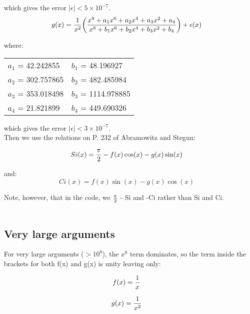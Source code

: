 \noindent which gives the error $|\epsilon| < 5 \times 10^{-7}$.\\

\begin{equation}
g(x) = {1 \over x^2}
\bigg({x^8 + a_1 x^6 + a_2 x^4 + a_3 x^2 + a_4 \over x^8 + b_1 x^6 + b_2 x^4 + b_3 x^2 + b_4}\bigg)
+ \epsilon(x)
\end{equation}

\noindent where:\\

\begin{center}
\begin{tabular}{|ll|}
\hline
$a_1$ = 42.242855 & $b_1$ = 48.196927\\
$a_2$ = 302.757865 & $b_2$ = 482.485984\\
$a_3$ = 353.018498 & $b_3$ = 1114.978885\\
$a_4$ = 21.821899 & $b_4$ = 449.690326\\
\hline
\end{tabular}
\end{center}

\noindent which gives the error $|\epsilon| < 3 \times 10^{-7}$.\\

Then we use the relations on P. 232 of Abramowitz and Stegun:

\begin{equation}
Si(x) = {\pi \over 2} - f(x) \cos(x) - g(x) \sin(x)
\end{equation}

\noindent and:\\

\begin{equation}
Ci(x) = f(x) \sin(x) - g(x) \cos(x)
\end{equation}

\noindent Note, however, that in the code, we ${\pi \over 2}$ - Si and -Ci
rather than Si and Ci.\\

\\

\subsection{Very large arguments}

\noindent For very large arguments ($> 10^8$), the $x^8$ term dominates, so
the term inside the brackets for both f(x) and g(x) is unity leaving only:

\begin{equation}
f(x) = {1 \over x}
\end{equation}

\begin{equation}
g(x) = {1 \over x^2}
\end{equation}
